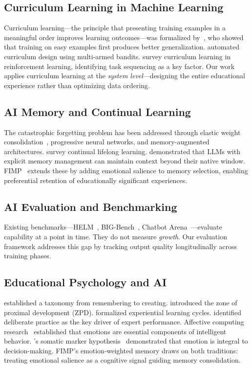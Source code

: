 \documentclass[11pt,a4paper]{article}
\begin{document}
\subsection{Curriculum Learning in Machine Learning}
Curriculum learning---the principle that presenting training examples in a meaningful order improves learning outcomes---was formalized by~\citet{bengio2009curriculum}, who showed that training on easy examples first produces better generalization. \citet{graves2017automated} automated curriculum design using multi-armed bandits. \citet{narvekar2020curriculum} survey curriculum learning in reinforcement learning, identifying task sequencing as a key factor. Our work applies curriculum learning at the \emph{system level}---designing the entire educational experience rather than optimizing data ordering.

\subsection{AI Memory and Continual Learning}
The catastrophic forgetting problem has been addressed through elastic weight consolidation~\citep{kirkpatrick2017overcoming}, progressive neural networks, and memory-augmented architectures. \citet{parisi2019continual} survey continual lifelong learning. \citet{packer2023memgpt} demonstrated that LLMs with explicit memory management can maintain context beyond their native window. FIMP~\citep{jo2026fimp} extends these by adding emotional salience to memory selection, enabling preferential retention of educationally significant experiences.

\subsection{AI Evaluation and Benchmarking}
Existing benchmarks---HELM~\citep{liang2023helm}, BIG-Bench~\citep{srivastava2023bigbench}, Chatbot Arena~\citep{zheng2024judging}---evaluate capability at a point in time. They do not measure \emph{growth}. Our evaluation framework addresses this gap by tracking output quality longitudinally across training phases.

\subsection{Educational Psychology and AI}
\citet{bloom1956taxonomy} established a taxonomy from remembering to creating. \citet{vygotsky1978mind} introduced the zone of proximal development (ZPD). \citet{kolb1984experiential} formalized experiential learning cycles. \citet{ericsson1993role} identified deliberate practice as the key driver of expert performance. Affective computing research~\citep{picard1997affective} established that emotions are essential components of intelligent behavior. \citeauthor{damasio1994descartes}'s somatic marker hypothesis~\citep{damasio1994descartes} demonstrated that emotion is integral to decision-making. FIMP's emotion-weighted memory draws on both traditions: treating emotional salience as a cognitive signal guiding memory consolidation.
\end{document}
